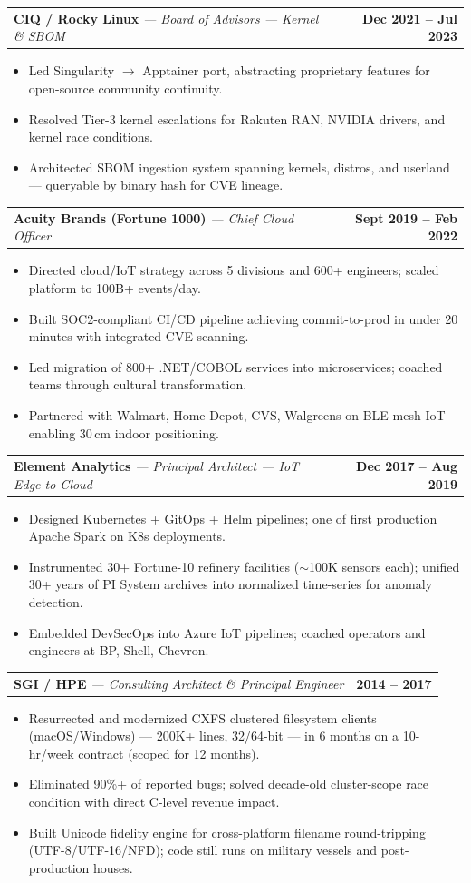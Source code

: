 \documentclass[letterpaper,10.5pt]{article}
\makeatletter
\newcommand{\resumeItem}[1]{\item\small{#1 \vspace{-2pt}}}
\newcommand{\resumeSubheading}[4]{
    \vspace{-2pt}\item
    \begin{tabular*}{1.0\textwidth}[t]{l@{\extracolsep{\fill}}r}
    \textbf{#1} \textit{\small — #3} & \textbf{\small #2} \\
    \end{tabular*}\vspace{-7pt}
}
\newcommand{\resumeItemListStart}{\begin{itemize}[leftmargin=0.15in]}
\newcommand{\resumeItemListEnd}{\end{itemize}\vspace{-5pt}}
\makeatother
\begin{document}
    \resumeSubheading
    {CIQ / Rocky Linux}{Dec 2021 -- Jul 2023}
    {Board of Advisors — Kernel \& SBOM}{}
    \resumeItemListStart
        \resumeItem{Led Singularity $\rightarrow$ Apptainer port, abstracting proprietary features for open-source community continuity.}
        \resumeItem{Resolved Tier-3 kernel escalations for Rakuten RAN, NVIDIA drivers, and kernel race conditions.}
        \resumeItem{Architected SBOM ingestion system spanning kernels, distros, and userland — queryable by binary hash for CVE lineage.}
    \resumeItemListEnd

    \resumeSubheading
    {Acuity Brands (Fortune 1000)}{Sept 2019 -- Feb 2022}
    {Chief Cloud Officer}{}
    \resumeItemListStart
        \resumeItem{Directed cloud/IoT strategy across 5 divisions and 600+ engineers; scaled platform to 100B+ events/day.}
        \resumeItem{Built SOC2-compliant CI/CD pipeline achieving commit-to-prod in under 20 minutes with integrated CVE scanning.}
        \resumeItem{Led migration of 800+ .NET/COBOL services into microservices; coached teams through cultural transformation.}
        \resumeItem{Partnered with Walmart, Home Depot, CVS, Walgreens on BLE mesh IoT enabling 30\,cm indoor positioning.}
    \resumeItemListEnd

    \resumeSubheading
    {Element Analytics}{Dec 2017 -- Aug 2019}
    {Principal Architect — IoT Edge-to-Cloud}{}
    \resumeItemListStart
        \resumeItem{Designed Kubernetes + GitOps + Helm pipelines; one of first production Apache Spark on K8s deployments.}
        \resumeItem{Instrumented 30+ Fortune-10 refinery facilities ($\sim$100K sensors each); unified 30+ years of PI System archives into normalized time-series for anomaly detection.}
        \resumeItem{Embedded DevSecOps into Azure IoT pipelines; coached operators and engineers at BP, Shell, Chevron.}
    \resumeItemListEnd

    \resumeSubheading
    {SGI / HPE}{2014 -- 2017}
    {Consulting Architect \& Principal Engineer}{}
    \resumeItemListStart
        \resumeItem{Resurrected and modernized CXFS clustered filesystem clients (macOS/Windows) — 200K+ lines, 32/64-bit — in 6 months on a 10-hr/week contract (scoped for 12 months).}
        \resumeItem{Eliminated 90\%+ of reported bugs; solved decade-old cluster-scope race condition with direct C-level revenue impact.}
        \resumeItem{Built Unicode fidelity engine for cross-platform filename round-tripping (UTF-8/UTF-16/NFD); code still runs on military vessels and post-production houses.}
    \resumeItemListEnd
\end{document}
